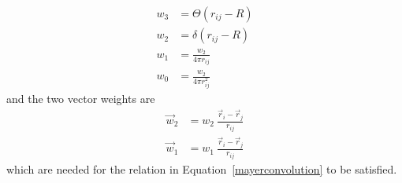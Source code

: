 \documentclass[double,12pt]{beavtex}
\begin{document}
\begin{align} 
      w_3 &= \Theta(r_{ij}-R)  \label{scalar-weight3} \\
      w_2 &= \delta(r_{ij}-R)  \\
      w_1 &= \frac{w_2}{4\pi r_{ij}}  \\
      w_0 &= \frac{w_2}{4\pi r_{ij}^2} \label{scalar-weight0}
\end{align}
and the two vector weights are
\begin{align}
      \vec {w}_2 &= w_2~\frac{\vec r_i-\vec r_j}{r_{ij}} \\
      \vec {w}_1 &= w_1~\frac{\vec r_i-\vec r_j}{r_{ij}}
\end{align}
which are needed for the relation in Equation~\ref{mayerconvolution} to be satisfied.
%
\end{document}
